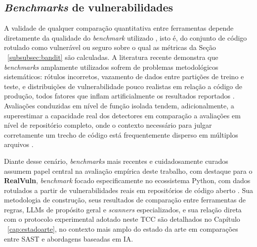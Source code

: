 \subsection{\textit{Benchmarks} de vulnerabilidades}\label{subsec:benchmarks-vulnerabilidades}
A validade de qualquer comparação quantitativa entre ferramentas depende diretamente da qualidade do \textit{benchmark} utilizado , isto é, do conjunto de código rotulado como vulnerável ou seguro sobre o qual as métricas da Seção ~\ref{subsubsec:bandit} são calculadas. A literatura recente demonstra que \textit{benchmarks} amplamente utilizados sofrem de problemas metodológicos sistemáticos: rótulos incorretos, vazamento de dados entre partições de treino e teste, e distribuições de vulnerabilidade pouco realistas em relação a código de produção, todos fatores que inflam artificialmente os resultados reportados \cite{Ding2025CodeLMVuln, Chen2023DiverseVul, Chakraborty2022DLLimits}. Avaliações conduzidas em nível de função isolada tendem, adicionalmente, a superestimar a capacidade real dos detectores em comparação a avaliações em nível de repositório completo, onde o contexto necessário para julgar corretamente um trecho de código está frequentemente disperso em múltiplos arquivos \cite{Wen2026VulEval}.

Diante desse cenário, \textit{benchmarks} mais recentes e cuidadosamente curados assumem papel central na avaliação empírica deste trabalho, com destaque para o \textbf{RealVuln}, \textit{benchmark} focado especificamente no ecossistema Python, com dados rotulados a partir de vulnerabilidades reais em repositórios de código aberto \cite{Pellew2026RealVuln}. Sua metodologia de construção, seus resultados de comparação entre ferramentas de regras, LLMs de propósito geral e \textit{scanners} especializados, e sua relação direta com o protocolo experimental adotado neste TCC são detalhados no Capítulo ~\ref{cap:estadoarte}, no contexto mais amplo do estado da arte em comparações entre SAST e abordagens baseadas em IA.
